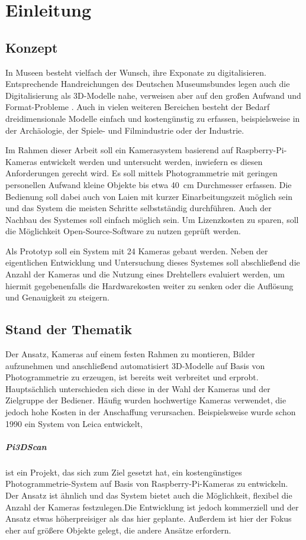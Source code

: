 \documentclass[./00PhotoBox.tex]{subfiles}
\begin{document}
\chapter{Einleitung}

\section{Konzept}

In Museen besteht vielfach der Wunsch, ihre Exponate zu digitalisieren. Entsprechende Handreichungen des Deutschen Museumsbundes legen auch die Digitalisierung als 3D-Modelle nahe, verweisen aber auf den großen Aufwand und Format-Probleme \citep[S. 43]{handreichung_digital}.
Auch in vielen weiteren Bereichen besteht der Bedarf dreidimensionale Modelle einfach und kostengünstig zu erfassen, beispielsweise in der Archäologie, der Spiele- und Filmindustrie oder der Industrie. 

Im Rahmen dieser Arbeit soll ein Kamerasystem basierend auf Raspberry-Pi-Kame\-ras entwickelt werden und untersucht werden, inwiefern es diesen Anforderungen gerecht wird. Es soll mittels Photogrammetrie mit geringen personellen Aufwand kleine Objekte bis etwa 40~cm Durchmesser erfassen. Die Bedienung soll dabei auch von Laien mit kurzer Einarbeitungszeit möglich sein und das System die meisten Schritte selbstständig durchführen. Auch der Nachbau des Systemes soll einfach möglich sein. Um Lizenzkosten zu sparen, soll die Möglichkeit Open-Source-Software zu nutzen geprüft werden.

Als Prototyp soll ein System mit 24 Kameras gebaut werden. Neben der eigentlichen Entwicklung und Untersuchung dieses Systemes soll abschließend die Anzahl der Kameras und die Nutzung eines Drehtellers evaluiert werden, um hiermit gegebenenfalls die Hardwarekosten weiter zu senken oder die Auflösung und Genauigkeit zu steigern.


\section{Stand der Thematik}
Der Ansatz, Kameras auf einem festen Rahmen zu montieren, Bilder aufzunehmen und anschließend automatisiert 3D-Modelle auf Basis von Photogrammetrie zu erzeugen, ist bereits weit verbreitet und erprobt. Hauptsächlich unterschieden sich diese in der Wahl der Kameras und der Zielgruppe der Bediener. Häufig wurden hochwertige Kameras verwendet, die jedoch hohe Kosten in der Anschaffung verursachen. Beispielsweise wurde schon 1990 ein System von Leica entwickelt,


\paragraph{Pi3DScan}
ist ein Projekt, das sich zum Ziel gesetzt hat, ein kostengünstiges Photo\-gram\-metrie-System auf Basis von Raspberry-Pi-Kameras zu entwickeln. Der Ansatz ist ähnlich und das System bietet auch die Möglichkeit, flexibel die Anzahl der Kameras festzulegen.Die Entwicklung ist jedoch kommerziell und der Ansatz etwas höherpreisiger als das hier geplante. Außerdem ist hier der Fokus eher auf größere Objekte gelegt, die andere Ansätze erfordern.
\citep{pi3dscanner}


\biblio
\end{document}
